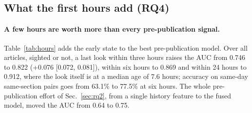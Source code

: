 \documentclass[10pt,a4paper,twocolumn]{article}
\begin{document}
\begin{table}[t]
\centering\footnotesize
\caption{RQ4: what a last look within $h$ hours of publication adds. Past-only, articles of 2013-07 to 2014-12 as
in Table~\ref{tab:called}; ``before'' is the pre-publication late fusion. Not yet past: sighted articles whose
count at the look is below 1{,}400.}
\label{tab:hours}
\setlength{\tabcolsep}{3pt}
\end{table}

\subsection{What the first hours add (RQ4)}
\label{sec:rq4}
\paragraph{A few hours are worth more than every pre-publication signal.} Table~\ref{tab:hours} adds the early
state to the best pre-publication model. Over all articles, sighted or not, a last look within three hours
raises the AUC from 0.746 to 0.822 (+0.076 [0.072, 0.081]), within six hours to 0.869 and within 24 hours to
0.912, where the look itself is at a median age of 7.6 hours; accuracy on same-day same-section pairs goes from
63.1\% to 77.5\% at six hours. The whole pre-publication effort of Sec.~\ref{sec:rq2}, from a single history
feature to the fused model, moved the AUC from 0.64 to 0.75.
\end{document}
